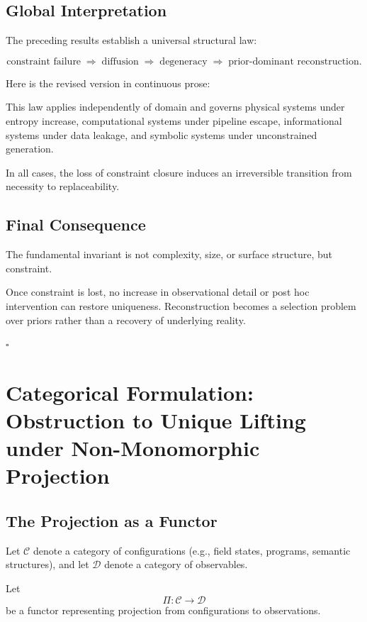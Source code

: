 \documentclass[12pt, oneside]{article}
\theoremstyle{plain}
\theoremstyle{definition}
\theoremstyle{remark}
\begin{document}
\subsection{Global Interpretation}

The preceding results establish a universal structural law:

\[
\text{constraint failure} \;\Rightarrow\; \text{diffusion} \;\Rightarrow\; \text{degeneracy} \;\Rightarrow\; \text{prior-dominant reconstruction}.
\]

Here is the revised version in continuous prose:

This law applies independently of domain and governs physical systems under entropy increase, computational systems under pipeline escape, informational systems under data leakage, and symbolic systems under unconstrained generation.

In all cases, the loss of constraint closure induces an irreversible transition from necessity to replaceability.

\subsection{Final Consequence}

The fundamental invariant is not complexity, size, or surface structure, but constraint.

Once constraint is lost, no increase in observational detail or post hoc intervention can restore uniqueness. Reconstruction becomes a selection problem over priors rather than a recovery of underlying reality.

\hfill $\square$

\section{Categorical Formulation: Obstruction to Unique Lifting under Non-Monomorphic Projection}

\subsection{The Projection as a Functor}

Let $\mathcal{C}$ denote a category of configurations (e.g., field states, programs, semantic structures), and let $\mathcal{D}$ denote a category of observables.

Let
\[
\Pi : \mathcal{C} \to \mathcal{D}
\]
be a functor representing projection from configurations to observations.
\end{document}
